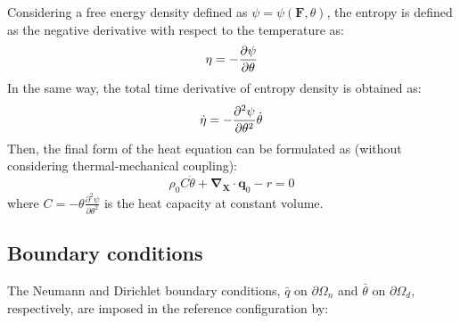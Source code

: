 \documentclass[oneside,11pt,times]{book}
\begin{document}
Considering a free energy density defined as $\psi=\psi(\bm{F},\theta)$, the entropy is defined as the negative derivative with respect to the temperature as:
\begin{equation}
\begin{aligned}
\centering
\eta=-\frac{\partial\psi}{\partial \theta}
\end{aligned}
\label{entropy}
\end{equation}
In the same way, the total time derivative of entropy density is obtained as:
\begin{equation}
\begin{aligned}
\centering
\dot{\eta}=-\frac{\partial^2\psi}{\partial \theta^2}\dot{\theta}
\end{aligned}
\label{entropy rate}
\end{equation}
Then, the final form of the heat equation can be formulated as (without considering thermal-mechanical coupling):
\begin{equation}
\rho_0C\dot{\theta}+\bm{\nabla_{X}}\cdot\bm{q}_0-r=0
\label{heateq}
\end{equation}
where $C=-\theta\frac{\partial^2\psi}{\partial \theta^2}$ is the heat capacity at constant volume.

\subsection{Boundary conditions}

The Neumann and Dirichlet boundary conditions, $\bar{q}$ on $\partial \Omega_n$ and $\bar{\theta}$ on $\partial \Omega_d$, respectively, are imposed in the reference configuration by:
\end{document}
